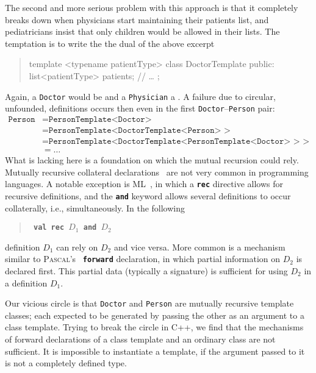 \documentclass[11pt]{article}
\numberwithin{figure}{section}
\newcommand\CC{\Lang{\mbox{C++}}\xspace}
\newcommand\Lang[1]{\textsc{#1}}
\newcommand{\kw}[1]{\texttt{\textbf{#1}}}
\newcommand{\cd}[1]{\texttt{#1}}
\newenvironment{excerpt}{\begin{quote}\begin{minipage}\textwidth}{\end{minipage}\end{quote}}
\begin{document}
The second and more serious problem with this approach is that it completely breaks down
    when physicians start maintaining their patients list, and pediatricians
    insist that only children would be allowed in their lists.
The temptation is to write the the dual of the above excerpt
\begin{excerpt}
\CPP
    template <typename patientType>
        class DoctorTemplate { public:
            list<patientType> patients;
            //{} \ldots
        };
\END\PROGbj{}
\end{excerpt}
Again, a \cd{Doctor} would be \PROGca{}
    and a \cd{Physician} a \PROGcb{}.
A failure due to circular, unfounded, definitions occurs then even
    in the first \cd{Doctor}--\cd{Person} pair: \[
\begin{split}
\cd{Person} & =  \cd{PersonTemplate<Doctor>} \\
            & = \cd{PersonTemplate<DoctorTemplate<Person> >} \\
            & = \cd{PersonTemplate<DoctorTemplate<PersonTemplate<Doctor> > >} \\
            & = \ldots
\end{split}
\]
What is lacking here is a foundation on which the mutual recursion could rely.
Mutually recursive collateral
    declarations~\cite[Chap.~4]{Watt:90} are not very common
    in programming languages.
A notable exception is ML~\cite{Paulson:91},
    in which a \kw{rec} directive allows
    for recursive definitions, and the \kw{and} keyword
    allows several definitions to occur collaterally, i.e., simultaneously.
In the following
\begin{excerpt}
    \tt
    \textbf{val rec}
        $D_1$ \textbf{and} $D_2$
\end{excerpt}
definition $D_1$ can rely on $D_2$ and vice versa.
More common is a mechanism similar to \textsc{Pascal}'s~\cite{Wirth:71}
    \kw{forward} declaration, in which partial information on $D_2$ is
    declared first.
This partial data (typically a signature) is sufficient for using $D_2$
    in a definition $D_1$.

Our vicious circle is that \cd{Doctor} and \cd{Person} are mutually
    recursive template classes; each expected
    to be generated by passing the other as an argument to a class template.
Trying to break the circle in \CC, we find that
    the mechanisms of forward declarations of
    a class template and an ordinary class are not sufficient.
It is impossible to instantiate a template, if the argument
    passed to it is not a completely defined type.
\end{document}
